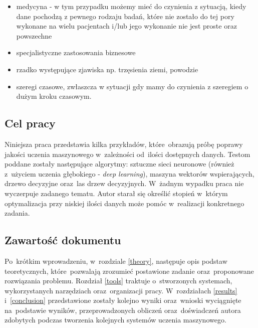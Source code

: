 \begin{itemize}
\item medycyna - w tym przypadku możemy mieć do czynienia z sytuacją, kiedy dane pochodzą z pewnego rodzaju badań, które nie zostało do tej pory wykonane na wielu pacjentach i/lub jego wykonanie nie jest proste oraz powszechne
\item specjalistyczne zastosowania biznesowe
\item rzadko występujące zjawiska np. trzęsienia ziemi, powodzie
\item szeregi czasowe,  zwłaszcza w sytuacji gdy mamy do czynienia z szeregiem o dużym kroku czasowym.
\end{itemize}

\subsection{Cel pracy}
Niniejsza praca przedstawia kilka przykładów, które~obrazują próbę poprawy jakości uczenia maszynowego w~zależności od~ilości dostępnych danych. Testom poddane  zostały następujące algorytmy: sztuczne sieci neuronowe (również z~użyciem uczenia głębokiego - \textit{deep learning}), maszyna wektorów wspierających, drzewo decyzyjne oraz~las drzew decyzyjnych. W~żadnym wypadku praca nie wyczerpuje zadanego tematu. Autor starał się określić stopień w~którym optymalizacja przy niskiej ilości danych może pomóc w~realizacji konkretnego zadania.

\subsection{Zawartość dokumentu}
Po~krótkim wprowadzeniu, w~rozdziale \ref{theory}, następuje opis podstaw teoretycznych, które~pozwalają zrozumieć postawione zadanie oraz~proponowane rozwiązania problemu. Rozdział \ref{tools} traktuje o~stworzonych systemach, wykorzystanych narzędziach oraz~organizacji pracy. W~rozdziałach \ref{results} i~\ref{conclusion} przedstawione zostały kolejno wyniki oraz~wnioski wyciągnięte na~podstawie wyników, przeprowadzonych obliczeń oraz~doświadczeń autora zdobytych podczas tworzenia kolejnych systemów uczenia maszynowego.



